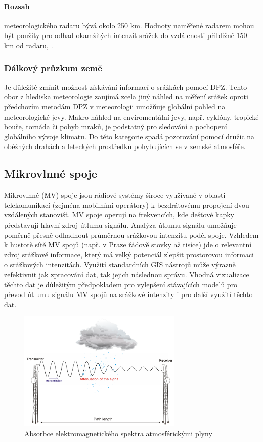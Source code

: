 \documentclass[a4paper,12pt,oneside]{report}
\begin{document}
\paragraph*{Rozsah} meteorologického radaru bývá okolo 250 km. Hodnoty
naměřené radarem mohou být použity pro odhad okamžitých intenzit
srážek do vzdálenosti přibližně 150 km od radaru, \cite{kohout}.

\subsubsection{Dálkový průzkum země}
Je důležité zmínit možnost získávání informací o srážkách pomocí
  \acs{DPZ}. Tento obor z hlediska meteorologie zaujímá zcela jiný
náhled na měření srážek oproti předchozím metodám   \acs{DPZ} v
meteorologii umožňuje globální pohled na meteorologické jevy. Makro
náhled na enviromentální jevy, např. cyklóny, tropické bouře, tornáda
či pohyb mraků, je podstatný pro sledování a pochopení globálního
vývoje klimatu. Do této kategorie spadá pozorování pomocí družic na
oběžných drahách a leteckých prostředků pohybujících se v zemské
atmosféře.


\subsection{Mikrovlnné spoje}
Mikrovlnné (MV) spoje jsou rádiové systémy široce využívané v oblasti
telekomunikací (zejména mobilními operátory) k bezdrátovému propojení
dvou vzdálených stanovišť. MV spoje operují na frekvencích, kde
dešťové kapky představují hlavní zdroj útlumu signálu. Analýza útlumu
signálu umožňuje poměrně přesně odhadnout průměrnou srážkovou
intenzitu podél spoje. Vzhledem k hustotě sítě MV spojů (např. v Praze
řádově stovky až tisíce) jde o relevantní zdroj srážkové informace,
který má velký potenciál zlepšit prostorovou informaci o srážkových
intenzitách. Využití standardních GIS nástrojů může výrazně
zefektivnit jak zpracování dat, tak jejich následnou správu.  Vhodná
vizualizace těchto dat je důležitým předpokladem pro vylepšení
stávajících modelů pro převod útlumu signálu MV spojů na srážkové
intenzity i pro další využití těchto dat.
 
\begin{figure}[h!]
    \centering
    \includegraphics[width=0.7\textwidth]{./img/srazky/microwave_link.png}
    \caption[Rušení radaru]{\centering Absorbce elektromagnetického spektra atmosférickými plyny  \footnotemark }
 \end{figure}   
\end{document}
